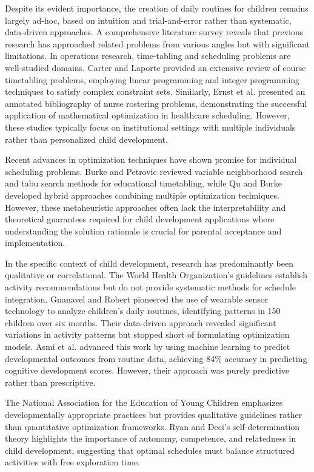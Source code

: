 \documentclass[10pt,conference,compsocconf]{IEEEtran}
\begin{document}
Despite its evident importance, the creation of daily routines for children remains largely ad-hoc, based on intuition and trial-and-error rather than systematic, data-driven approaches. A comprehensive literature survey reveals that previous research has approached related problems from various angles but with significant limitations. In operations research, time-tabling and scheduling problems are well-studied domains. Carter and Laporte \cite{carter1998recent} provided an extensive review of course timetabling problems, employing linear programming and integer programming techniques to satisfy complex constraint sets. Similarly, Ernst et al. \cite{ernst2004annotated} presented an annotated bibliography of nurse rostering problems, demonstrating the successful application of mathematical optimization in healthcare scheduling. However, these studies typically focus on institutional settings with multiple individuals rather than personalized child development.

Recent advances in optimization techniques have shown promise for individual scheduling problems. Burke and Petrovic \cite{burke2002recent} reviewed variable neighborhood search and tabu search methods for educational timetabling, while Qu and Burke \cite{qu2009hybrid} developed hybrid approaches combining multiple optimization techniques. However, these metaheuristic approaches often lack the interpretability and theoretical guarantees required for child development applications where understanding the solution rationale is crucial for parental acceptance and implementation.

In the specific context of child development, research has predominantly been qualitative or correlational. The World Health Organization's guidelines \cite{who2019guidelines} establish activity recommendations but do not provide systematic methods for schedule integration. Gnanavel and Robert \cite{gnanavel2020data} pioneered the use of wearable sensor technology to analyze children's daily routines, identifying patterns in 150 children over six months. Their data-driven approach revealed significant variations in activity patterns but stopped short of formulating optimization models. Asmi et al. \cite{asmi2021machine} advanced this work by using machine learning to predict developmental outcomes from routine data, achieving 84\% accuracy in predicting cognitive development scores. However, their approach was purely predictive rather than prescriptive.

The National Association for the Education of Young Children \cite{naeyc2020developmentally} emphasizes developmentally appropriate practices but provides qualitative guidelines rather than quantitative optimization frameworks. Ryan and Deci's self-determination theory \cite{ryan2000self} highlights the importance of autonomy, competence, and relatedness in child development, suggesting that optimal schedules must balance structured activities with free exploration time.
\end{document}
